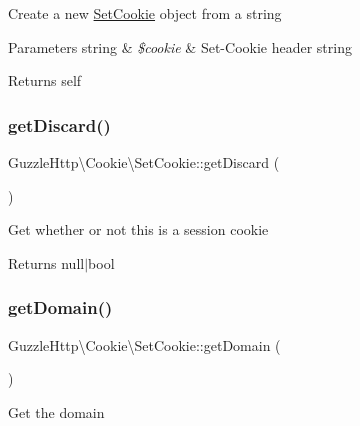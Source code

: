 Create a new \hyperlink{classGuzzleHttp_1_1Cookie_1_1SetCookie}{Set\+Cookie} object from a string


\begin{DoxyParams}[1]{Parameters}
string & {\em \$cookie} & Set-\/\+Cookie header string\\
\hline
\end{DoxyParams}
\begin{DoxyReturn}{Returns}
self 
\end{DoxyReturn}
\mbox{\label{classGuzzleHttp_1_1Cookie_1_1SetCookie_ac6b3f111c8b7f606a12466ca0d6e5e6f}} 
\subsubsection{\texorpdfstring{get\+Discard()}{getDiscard()}}
{\footnotesize\ttfamily Guzzle\+Http\textbackslash{}\+Cookie\textbackslash{}\+Set\+Cookie\+::get\+Discard (\begin{DoxyParamCaption}{ }\end{DoxyParamCaption})}

Get whether or not this is a session cookie

\begin{DoxyReturn}{Returns}
null$\vert$bool 
\end{DoxyReturn}
\mbox{\label{classGuzzleHttp_1_1Cookie_1_1SetCookie_a00d077c7eb6f6c5f62f28b3065250280}} 
\subsubsection{\texorpdfstring{get\+Domain()}{getDomain()}}
{\footnotesize\ttfamily Guzzle\+Http\textbackslash{}\+Cookie\textbackslash{}\+Set\+Cookie\+::get\+Domain (\begin{DoxyParamCaption}{ }\end{DoxyParamCaption})}

Get the domain

